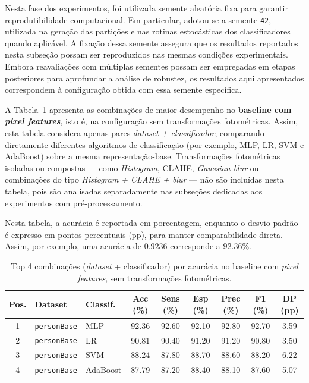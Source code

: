 \documentclass[12pt,a4paper]{article}
\begin{document}
Nesta fase dos experimentos, foi utilizada semente aleatória fixa para garantir reprodutibilidade computacional. Em particular, adotou-se a semente \texttt{42}, utilizada na geração das partições e nas rotinas estocásticas dos classificadores quando aplicável. A fixação dessa semente assegura que os resultados reportados nesta subseção possam ser reproduzidos nas mesmas condições experimentais. Embora reavaliações com múltiplas sementes possam ser empregadas em etapas posteriores para aprofundar a análise de robustez, os resultados aqui apresentados correspondem à configuração obtida com essa semente específica.

A Tabela~\ref{tab:feat-top4} apresenta as combinações de maior desempenho no \textbf{baseline com \emph{pixel features}}, isto é, na configuração sem transformações fotométricas. Assim, esta tabela considera apenas pares \textit{dataset + classificador}, comparando diretamente diferentes algoritmos de classificação (por exemplo, MLP, LR, SVM e AdaBoost) sobre a mesma representação-base. Transformações fotométricas isoladas ou compostas --- como \textit{Histogram}, CLAHE, \textit{Gaussian blur} ou combinações do tipo \textit{Histogram + CLAHE + blur} --- não são incluídas nesta tabela, pois são analisadas separadamente nas subseções dedicadas aos experimentos com pré-processamento.

Nesta tabela, a acurácia é reportada em porcentagem, enquanto o desvio padrão é expresso em pontos percentuais (pp), para manter comparabilidade direta. Assim, por exemplo, uma acurácia de \(0.9236\) corresponde a \(92.36\%\).

\begin{table}[htbp]
\centering
\caption{Top 4 combinações (\textit{dataset} + classificador) por acurácia no baseline com \emph{pixel features}, sem transformações fotométricas.}
\label{tab:feat-top4}
\scriptsize
\setlength{\tabcolsep}{3pt}
\renewcommand{\arraystretch}{1.12}
\begin{tabular}{cllcccccc}
\toprule
\textbf{Pos.} & \textbf{Dataset} & \textbf{Classif.} & \textbf{Acc (\%)} & \textbf{Sens (\%)} & \textbf{Esp (\%)} & \textbf{Prec (\%)} & \textbf{F1 (\%)} & \textbf{DP (pp)} \\
\midrule
1 & \texttt{personBase} & MLP      & 92.36 & 92.60 & 92.10 & 92.80 & 92.70 & 3.59 \\
2 & \texttt{personBase} & LR       & 90.81 & 90.40 & 91.20 & 91.20 & 90.80 & 3.50 \\
3 & \texttt{personBase} & SVM      & 88.24 & 87.80 & 88.70 & 88.60 & 88.20 & 6.22 \\
4 & \texttt{personBase} & AdaBoost & 87.79 & 87.20 & 88.40 & 88.10 & 87.60 & 5.07 \\
\bottomrule
\end{tabular}
\end{table}
\end{document}
